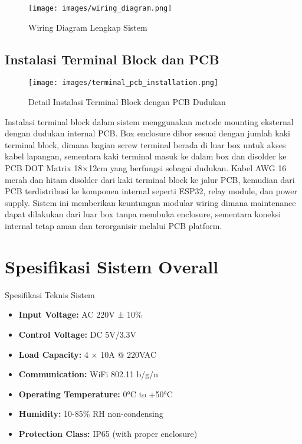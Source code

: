 \documentclass[12pt,a4paper]{article}
\begin{document}
\begin{figure}[H]
\centering
\texttt{[image: images/wiring\_diagram.png]}
\caption{Wiring Diagram Lengkap Sistem}
\label{fig:wiring_diagram}
\end{figure}

\subsection{Instalasi Terminal Block dan PCB}

\begin{figure}[H]
\centering
\texttt{[image: images/terminal\_pcb\_installation.png]}
\caption{Detail Instalasi Terminal Block dengan PCB Dudukan}
\label{fig:terminal_pcb_installation}
\end{figure}

Instalasi terminal block dalam sistem menggunakan metode mounting eksternal dengan dudukan internal PCB. Box enclosure dibor sesuai dengan jumlah kaki terminal block, dimana bagian screw terminal berada di luar box untuk akses kabel lapangan, sementara kaki terminal masuk ke dalam box dan disolder ke PCB DOT Matrix 18×12cm yang berfungsi sebagai dudukan. Kabel AWG 16 merah dan hitam disolder dari kaki terminal block ke jalur PCB, kemudian dari PCB terdistribusi ke komponen internal seperti ESP32, relay module, dan power supply. Sistem ini memberikan keuntungan modular wiring dimana maintenance dapat dilakukan dari luar box tanpa membuka enclosure, sementara koneksi internal tetap aman dan terorganisir melalui PCB platform.

\section{Spesifikasi Sistem Overall}

\begin{specbox}{Spesifikasi Teknis Sistem}
\begin{itemize}
\item \textbf{Input Voltage:} AC 220V ± 10\%
\item \textbf{Control Voltage:} DC 5V/3.3V
\item \textbf{Load Capacity:} 4 × 10A @ 220VAC
\item \textbf{Communication:} WiFi 802.11 b/g/n
\item \textbf{Operating Temperature:} 0°C to +50°C
\item \textbf{Humidity:} 10-85\% RH non-condensing
\item \textbf{Protection Class:} IP65 (with proper enclosure)
\end{itemize}
\end{specbox}
\end{document}
